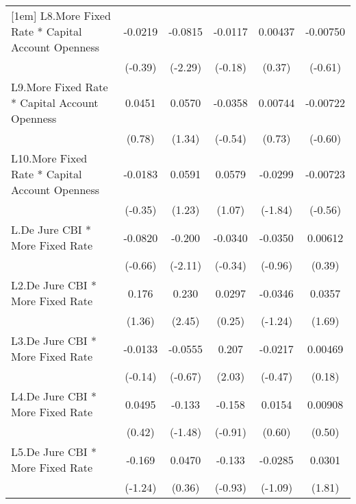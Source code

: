 {\begin{longtable}{l*{5}{c}}
[1em]
L8.More Fixed Rate * Capital Account Openness&  -0.0219         &  -0.0815\sym{*}  &  -0.0117         &  0.00437         & -0.00750         \\
                &  (-0.39)         &  (-2.29)         &  (-0.18)         &   (0.37)         &  (-0.61)         \\
[1em]
L9.More Fixed Rate * Capital Account Openness&   0.0451         &   0.0570         &  -0.0358         &  0.00744         & -0.00722         \\
                &   (0.78)         &   (1.34)         &  (-0.54)         &   (0.73)         &  (-0.60)         \\
[1em]
L10.More Fixed Rate * Capital Account Openness&  -0.0183         &   0.0591         &   0.0579         &  -0.0299         & -0.00723         \\
                &  (-0.35)         &   (1.23)         &   (1.07)         &  (-1.84)         &  (-0.56)         \\
[1em]
L.De Jure CBI * More Fixed Rate&  -0.0820         &   -0.200\sym{*}  &  -0.0340         &  -0.0350         &  0.00612         \\
                &  (-0.66)         &  (-2.11)         &  (-0.34)         &  (-0.96)         &   (0.39)         \\
[1em]
L2.De Jure CBI * More Fixed Rate&    0.176         &    0.230\sym{*}  &   0.0297         &  -0.0346         &   0.0357         \\
                &   (1.36)         &   (2.45)         &   (0.25)         &  (-1.24)         &   (1.69)         \\
[1em]
L3.De Jure CBI * More Fixed Rate&  -0.0133         &  -0.0555         &    0.207\sym{*}  &  -0.0217         &  0.00469         \\
                &  (-0.14)         &  (-0.67)         &   (2.03)         &  (-0.47)         &   (0.18)         \\
[1em]
L4.De Jure CBI * More Fixed Rate&   0.0495         &   -0.133         &   -0.158         &   0.0154         &  0.00908         \\
                &   (0.42)         &  (-1.48)         &  (-0.91)         &   (0.60)         &   (0.50)         \\
[1em]
L5.De Jure CBI * More Fixed Rate&   -0.169         &   0.0470         &   -0.133         &  -0.0285         &   0.0301         \\
                &  (-1.24)         &   (0.36)         &  (-0.93)         &  (-1.09)         &   (1.81)         \\

\end{longtable}}
